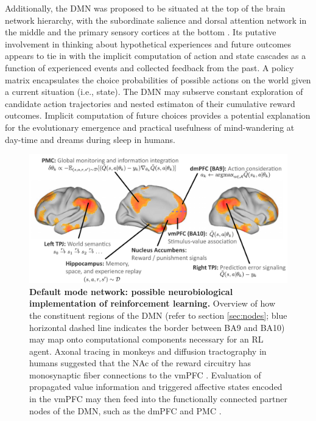 \documentclass[10pt,letterpaper]{article}
\begin{document}
Additionally,
the DMN was proposed to be situated
at the top of the brain network hierarchy, with
the subordinate salience and dorsal attention network in the middle and
the primary sensory cortices at the bottom
\citep{carhart2010default, margulies2016situating}.
Its putative involvement in thinking about 
hypothetical experiences and future outcomes
appears to tie in with the implicit computation of
action and state cascades as a function of
experienced events and collected feedback from the past.
A policy matrix encapsulates the choice probabilities of possible actions
on the world given a current situation (i.e., state).
The DMN may subserve
  constant exploration of candidate action trajectories and
  nested estimaton of their
  cumulative reward outcomes. Implicit computation of future choices
  provides a potential explanation for the
  evolutionary emergence and practical usefulness of
  mind-wandering at day-time and dreams during sleep
  in humans.
\begin{figure}[!h]
  \includegraphics[width=.9\linewidth]{neurobiological_and_rl_overview_DMN.pdf}
  \caption{\textbf{Default mode network:
  possible neurobiological implementation of reinforcement learning.}
  Overview of how the constituent regions of the DMN (refer to section \ref{sec:nodes}; blue horizontal dashed line indicates the border between BA9 and BA10) may
  map onto computational components necessary for an RL agent.
  Axonal tracing in monkeys and diffusion tractography in humans suggested
  that the NAc of the reward circuitry has monosynaptic fiber connections
  to the vmPFC \citep{haber1995, croxson2005quantitative}. Evaluation of
  propagated value information and triggered affective states encoded
  in the vmPFC may then feed into the functionally connected partner nodes of
  the DMN, such as the dmPFC and PMC \citep{andrews2010, bzdok2013segregation}.
}
  \label{fig:rl_process_chart}
\end{figure}
\end{document}
